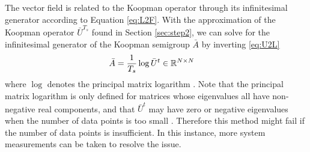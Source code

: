 The vector field is related to the Koopman operator through its infinitesimal generator according to Equation \eqref{eq:L2F}.
With the approximation of the Koopman operator $\bar{U}^{T_s}$ found in Section \ref{sec:step2}, we can solve for the infinitesimal generator of the Koopman semigroup  $\bar{A}$ by inverting \eqref{eq:U2L}
\begin{align}
    \bar{A} &= \frac{1}{T_s} \log{ \bar{U}^t } \in \mathbb{R}^{N \times N}
\end{align}
where $\log$ denotes the principal matrix logarithm \cite[Chapter 11]{higham2008functions}.
Note that the principal matrix logarithm is only defined for matrices whose eigenvalues all have non-negative real components, and that $\bar{U}^t$ may have zero or negative eigenvalues when the number of data points is too small \cite{mauroy2016linear}.
Therefore this method might fail if the number of data points is insufficient.
In this instance, more system measurements can be taken to resolve the issue.

